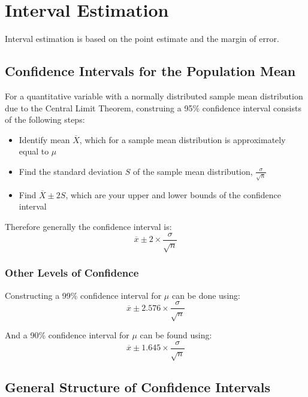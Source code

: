 \documentclass[12pt letter]{report}
\begin{document}

\section{Interval Estimation}


Interval estimation is based on the point estimate and the margin of error.

\subsection{Confidence Intervals for the Population Mean}

For a quantitative variable with a normally distributed sample mean distribution due to the Central Limit Theorem,
construing a 95\% confidence interval consists of the following steps:
\begin{itemize}
  \item Identify mean $\overline{X}$, which for a sample mean distribution is approximately equal to $\mu $
  \item Find the standard deviation $S$ of the sample mean distribution, $\frac{\sigma}{\sqrt{n}}$
  \item Find $\overline{X} \pm 2 S $, which are your upper and lower bounds of the confidence interval
\end{itemize}

Therefore generally the confidence interval is:
\[
  \overline{x} \pm 2 \times \frac{\sigma}{\sqrt{n}}
\]

\subsubsection{Other Levels of Confidence}

Constructing a 99\% confidence interval for $\mu $ can be done using:
\[
  \overline{x} \pm 2.576 \times \frac{\sigma}{\sqrt{n}}
\]

And a 90\% confidence interval for $\mu $ can be found using:
\[
  \overline{x} \pm 1.645 \times \frac{\sigma}{\sqrt{n}}
\]

\subsection{General Structure of Confidence Intervals}
\end{document}
